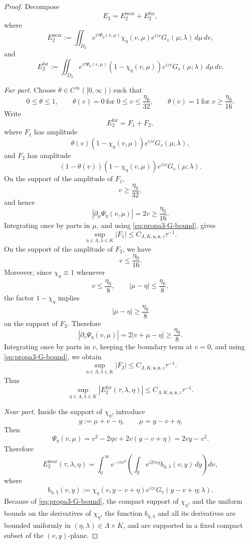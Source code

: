 \documentclass[10pt]{article}
\numberwithin{equation}{section}
\numberwithin{theorem}{section}
\begin{document}
\begin{appendix}
\begin{proof}
Decompose
\[
E_2=E_2^{\mathrm{near}}+E_2^{\mathrm{far}},
\]
where
\[
E_2^{\mathrm{near}}
:=
\iint_{D_2}
e^{i\tau\Psi_\eta(v,\mu)}
\chi_\eta(v,\mu)e^{izv}G_v(\mu;\lambda)\,d\mu\,dv,
\]
and
\[
E_2^{\mathrm{far}}
:=
\iint_{D_2}
e^{i\tau\Psi_\eta(v,\mu)}
(1-\chi_\eta(v,\mu))e^{izv}G_v(\mu;\lambda)\,d\mu\,dv.
\]

\smallskip
\noindent\emph{Far part.}
Choose \(\theta\in C^\infty([0,\infty))\) such that
\[
0\le\theta\le1,\qquad
\theta(v)=0\ \text{for }0\le v\le\frac{\eta_0}{32},
\qquad
\theta(v)=1\ \text{for }v\ge\frac{\eta_0}{16}.
\]
Write
\[
E_2^{\mathrm{far}}=F_1+F_2,
\]
where \(F_1\) has amplitude
\[
\theta(v)(1-\chi_\eta(v,\mu))e^{izv}G_v(\mu;\lambda),
\]
and \(F_2\) has amplitude
\[
(1-\theta(v))(1-\chi_\eta(v,\mu))e^{izv}G_v(\mu;\lambda).
\]
On the support of the amplitude of \(F_1\),
\[
v\ge\frac{\eta_0}{32},
\]
and hence
\[
|\partial_\mu\Psi_\eta(v,\mu)|=2v\ge\frac{\eta_0}{16}.
\]
Integrating once by parts in \(\mu\), and using \eqref{eq:propa3-G-bound}, gives
\[
\sup_{\eta\in\Lambda,\lambda\in K}|F_1|
\le
C_{\Lambda,K,\mathfrak u,\mathfrak v,z}\tau^{-1}.
\]
On the support of the amplitude of \(F_2\), we have
\[
v\le\frac{\eta_0}{16}.
\]
Moreover, since \(\chi_\eta\equiv1\) whenever
\[
v\le\frac{\eta_0}{8},
\qquad
|\mu-\eta|\le\frac{\eta_0}{8},
\]
the factor \(1-\chi_\eta\) implies
\[
|\mu-\eta|\ge\frac{\eta_0}{8}
\]
on the support of \(F_2\). Therefore
\[
|\partial_v\Psi_\eta(v,\mu)|
=
2|v+\mu-\eta|
\ge
\frac{\eta_0}{8}.
\]
Integrating once by parts in \(v\), keeping the boundary term at \(v=0\), and using
\eqref{eq:propa3-G-bound}, we obtain
\[
\sup_{\eta\in\Lambda,\lambda\in K}|F_2|
\le
C_{\Lambda,K,\mathfrak u,\mathfrak v,z}\tau^{-1}.
\]
Thus
\begin{equation}
\label{eq:propa3-E2-far-estimate}
\sup_{\eta\in\Lambda,\lambda\in K}
|E_2^{\mathrm{far}}(\tau,\lambda,\eta)|
\le
C_{\Lambda,K,\mathfrak u,\mathfrak v,z}\tau^{-1}.
\end{equation}

\smallskip
\noindent\emph{Near part.}
Inside the support of \(\chi_\eta\), introduce
\[
y:=\mu+v-\eta,
\qquad
\mu=y-v+\eta.
\]
Then
\[
\Psi_\eta(v,\mu)
=
v^2-2\eta v+2v(y-v+\eta)
=
2vy-v^2.
\]
Therefore
\begin{equation}
\label{eq:propa3-E2-near-rewrite}
E_2^{\mathrm{near}}(\tau,\lambda,\eta)
=
\int_0^\infty e^{-i\tau v^2}
\left(
\int_{\mathbb R}e^{i2\tau vy}b_{\eta,\lambda}(v,y)\,dy
\right)dv,
\end{equation}
where
\[
b_{\eta,\lambda}(v,y)
:=
\chi_\eta(v,y-v+\eta)e^{izv}G_v(y-v+\eta;\lambda).
\]
Because of \eqref{eq:propa3-G-bound}, the compact support of \(\chi_\eta\), and the
uniform bounds on the derivatives of \(\chi_\eta\), the function \(b_{\eta,\lambda}\) and
all its derivatives are bounded uniformly in \((\eta,\lambda)\in\Lambda\times K\), and are
supported in a fixed compact subset of the \((v,y)\)-plane.


\end{proof}
\end{appendix}
\end{document}
